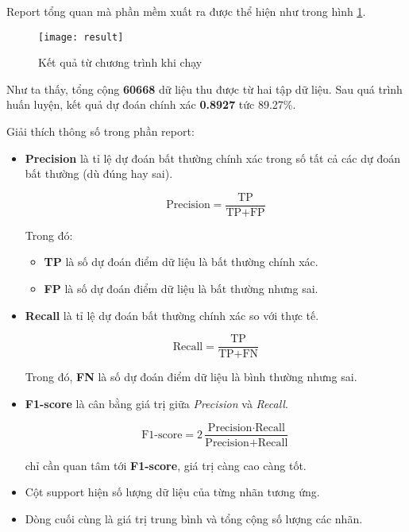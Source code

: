 \documentclass[../main-report.tex]{subfiles}
\begin{document}
Report tổng quan mà phần mềm xuất ra được thể hiện như trong hình \ref{fig:result}.

\begin{figure}[ht!]
\centering\texttt{[image: result]}
\caption{Kết quả từ chương trình khi chạy}
\label{fig:result}
\end{figure}

Như ta thấy, tổng cộng \textbf{60668} dữ liệu thu được từ hai tập dữ liệu. Sau quá trình huấn luyện, kết quả dự đoán chính xác \textbf{0.8927} tức 89.27\%.

Giải thích thông số trong phần report:

\begin{itemize}
\item \textbf{Precision} là tỉ lệ dự đoán bất thường chính xác trong số tất cả các dự đoán bất thường (dù đúng hay sai).

\begin{displaymath}
\text{Precision} = \frac{\text{TP}}{\text{TP} + \text{FP}} 
\end{displaymath}

Trong đó:

\begin{itemize}
\item \textbf{TP} là số dự đoán điểm dữ liệu là bất thường chính xác.
\item \textbf{FP} là số dự đoán điểm dữ liệu là bất thường nhưng sai.
\end{itemize}

\item \textbf{Recall} là tỉ lệ dự đoán bất thường chính xác so với thực tế.

\begin{displaymath}
\text{Recall} = \frac{\text{TP}}{\text{TP} + \text{FN}}
\end{displaymath}

Trong đó, \textbf{FN} là số dự đoán điểm dữ liệu là bình thường nhưng sai.

\item \textbf{F1-score} là cân bằng giá trị giữa \emph{Precision} và \emph{Recall}. 

\begin{displaymath}
\text{F1-score} = 2\frac{\text{Precision}\cdot \text{Recall}}{\text{Precision} + \text{Recall}}
\end{displaymath}

chỉ cần quan tâm tới \textbf{F1-score}, giá trị càng cao càng tốt.
\item Cột support hiện số lượng dữ liệu của từng nhãn tương ứng.
\item Dòng cuối cùng là giá  trị trung bình và tổng cộng số lượng các nhãn.
\end{itemize}
\end{document}
